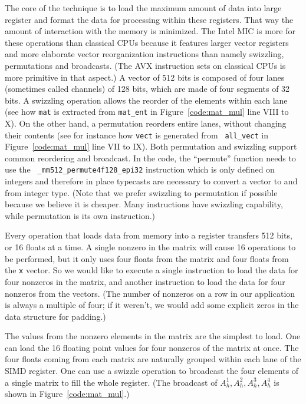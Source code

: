 \documentclass{sig-alternate}
\def\ee#1{{#1}}
\begin{document}
\ee{The core of the technique is to load the maximum amount of data
  into large register and format the data for processing within these
  registers. That way the amount of interaction with the memory is
  minimized. The Intel MIC is more for these operations than classical
  CPUs because it features larger vector registers and more elaborate
  vector reorganization instructions than namely swizzling,
  permutations and broadcasts. (The AVX instruction sets on classical
  CPUs is more primitive in that aspect.)} A vector of 512 bits is
composed of four lanes (sometimes called channels) of 128 bits, which
are made of four segments of 32 bits. A swizzling operation allows the
reorder of the elements within each lane (see how {\tt mat} is
extracted from {\tt mat\_ent} in Figure~\ref{code:mat_mul} line VIII to X). On the
other hand, a permutation reorders entire lanes, without changing
their contents (see for instance how {\tt vect} is generated from {\tt
  all\_vect} in Figure~\ref{code:mat_mul} line VII to IX).  Both permutation and
swizzling support common reordering and broadcast. In the code, the
``permute'' function needs to use the {\tt
  \_mm512\_permute4f128\_epi32} instruction which is only defined on
integers and therefore in place typecasts are necessary to convert a
vector to and from integer type.  (Note that we prefer swizzling to
permutation if possible because we believe it is cheaper. Many
instructions have swizzling capability, while permutation is its own
instruction.)

Every operation that loads data from memory into a register
transfers 512 bits, or 16 floats at a time. A single nonzero
in the matrix will cause 16 operations to be performed, but it only
uses four floats from the matrix and four floats from the {\tt x} vector. So
we would like to execute a single instruction to load the data for four 
nonzeros in the matrix, and another instruction to load the data for
four nonzeros from the vectors.  
(The number of nonzeros on a row in our application is
always a multiple of four; if it weren't, we would add some explicit
zeros in the data structure for padding.)

The values from the nonzero elements in the matrix are the simplest to
load. One can load the 16 floating point values for four nonzeros of
the matrix at once. The four floats coming from each matrix are
naturally grouped within each lane of the SIMD register. One can use a
swizzle operation to broadcast the four elements of a single matrix to
fill the whole register. (The broadcast of $A_h^1,A_h^2,A_h^3,A_h^4$ is
shown in Figure~\ref{code:mat_mul}.)
\end{document}
